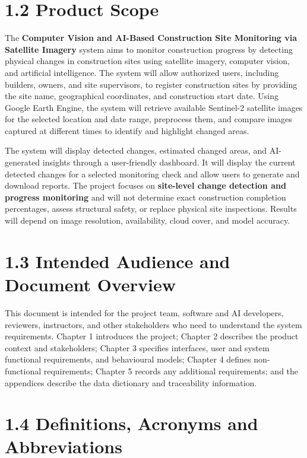 \documentclass[12pt,a4paper]{report}
\begin{document}
\section{1.2 Product Scope}\label{product-scope}

The \textbf{Computer Vision and AI-Based Construction Site Monitoring
via Satellite Imagery} system aims to monitor construction progress by
detecting physical changes in construction sites using satellite
imagery, computer vision, and artificial intelligence. The system will
allow authorized users, including builders, owners, and site
supervisors, to register construction sites by providing the site name,
geographical coordinates, and construction start date. Using Google
Earth Engine, the system will retrieve available Sentinel-2 satellite
images for the selected location and date range, preprocess them, and
compare images captured at different times to identify and highlight
changed areas.

The system will display detected changes, estimated changed areas, and
AI-generated insights through a user-friendly dashboard. It will display
the current detected changes for a selected monitoring check and allow
users to generate and download reports. The project focuses on
\textbf{site-level change detection and progress monitoring} and will
not determine exact construction completion percentages, assess
structural safety, or replace physical site inspections. Results will
depend on image resolution, availability, cloud cover, and model
accuracy.

\section{1.3 Intended Audience and Document
Overview}\label{intended-audience-and-document-overview}

This document is intended for the project team, software and AI
developers, reviewers, instructors, and other stakeholders who need to
understand the system requirements. Chapter 1 introduces the project;
Chapter 2 describes the product context and stakeholders; Chapter 3
specifies interfaces, user and system functional requirements, and
behavioural models; Chapter 4 defines non-functional requirements;
Chapter 5 records any additional requirements; and the appendices
describe the data dictionary and traceability information.

\section{1.4 Definitions, Acronyms and
Abbreviations}\label{definitions-acronyms-and-abbreviations}
\end{document}
